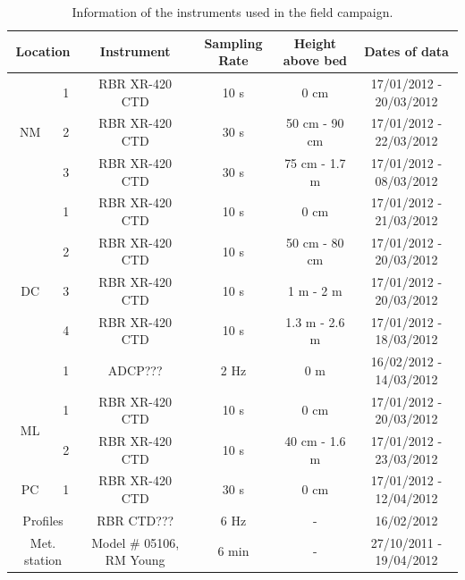 \documentclass[tesis.tex]{subfiles}
\begin{document}
\begin{table}[h!]
    \centering
    \caption{Information of the instruments used in the field campaign.}
    \begin{tabular}{|cc|c|c|c|c|}
    \hline
    \multicolumn{2}{|c|}{Location}                & Instrument & Sampling Rate & Height above bed & Dates of data           \\ \hline
    \multicolumn{1}{|c|}{\multirow{3}{*}{NM}} & 1 & RBR XR-420 CTD    & 10 s          & 0 cm             & 17/01/2012 - 20/03/2012 \\ \cline{2-6} 
    \multicolumn{1}{|c|}{}                    & 2 & RBR XR-420 CTD    & 30 s          & 50 cm - 90 cm    & 17/01/2012 - 22/03/2012 \\ \cline{2-6} 
    \multicolumn{1}{|c|}{}                    & 3 & RBR XR-420 CTD    & 30 s          & 75 cm -  1.7 m   & 17/01/2012 - 08/03/2012 \\ \hline
    \multicolumn{1}{|c|}{\multirow{5}{*}{DC}} & 1 & RBR XR-420 CTD    & 10 s          & 0 cm             & 17/01/2012 - 21/03/2012 \\ \cline{2-6} 
    \multicolumn{1}{|c|}{}                    & 2 & RBR XR-420 CTD    & 10 s          & 50 cm - 80 cm    & 17/01/2012 - 20/03/2012 \\ \cline{2-6} 
    \multicolumn{1}{|c|}{}                    & 3 & RBR XR-420 CTD    & 10 s          & 1 m - 2 m        & 17/01/2012 - 20/03/2012 \\ \cline{2-6} 
    \multicolumn{1}{|c|}{}                    & 4 & RBR XR-420 CTD    & 10 s          & 1.3 m - 2.6 m    & 17/01/2012 - 18/03/2012 \\ \cline{2-6} 
    \multicolumn{1}{|c|}{} & \multicolumn{1}{c|}{1} & \multicolumn{1}{c|}{ADCP???} & 2 Hz & \multicolumn{1}{c|}{0 m} & \multicolumn{1}{c|}{16/02/2012 - 14/03/2012} \\ \hline
    \multicolumn{1}{|c|}{\multirow{2}{*}{ML}} & 1 & RBR XR-420 CTD    & 10 s          & 0 cm             & 17/01/2012 - 20/03/2012 \\ \cline{2-6} 
    \multicolumn{1}{|c|}{}                    & 2 & RBR XR-420 CTD    & 10 s          & 40 cm - 1.6 m    & 17/01/2012 - 23/03/2012 \\ \hline
    \multicolumn{1}{|c|}{PC}                  & 1 & RBR XR-420 CTD    & 30 s          & 0 cm             & 17/01/2012 - 12/04/2012 \\ \hline
    \multicolumn{2}{|c|}{Profiles}               & RBR CTD???    & 6 Hz          & -                & 16/02/2012              \\ \hline
    \multicolumn{2}{|c|}{Met. station}               & Model \# 05106, RM Young    & 6 min          & -                & 27/10/2011 - 19/04/2012  \\ \hline
    \end{tabular}
    \label{tab:instr}
    \end{table}
\end{document}
